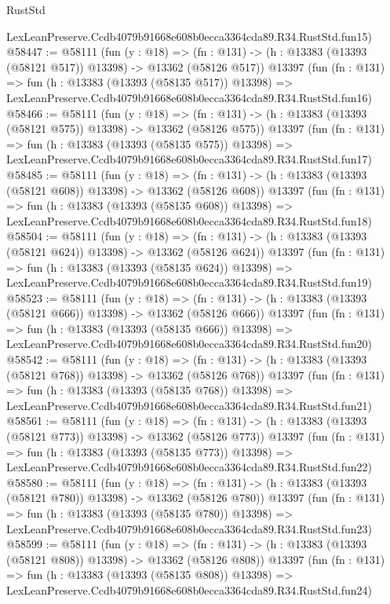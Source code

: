 \begin{lexlean}{RustStd}
\begin{coremodule}
    LexLeanPreserve.Ccdb4079b91668e608b0ecca3364cda89.R34.RustStd.fun15)
@58447 := @58111
    (fun (y : @18) =>
    (fn : @131) -> (h : @13383 (@13393 (@58121 @517)) @13398) -> @13362 (@58126 @517))
    @13397
    (fun (fn : @131) =>
    fun (h : @13383 (@13393 (@58135 @517)) @13398) =>
    LexLeanPreserve.Ccdb4079b91668e608b0ecca3364cda89.R34.RustStd.fun16)
@58466 := @58111
    (fun (y : @18) =>
    (fn : @131) -> (h : @13383 (@13393 (@58121 @575)) @13398) -> @13362 (@58126 @575))
    @13397
    (fun (fn : @131) =>
    fun (h : @13383 (@13393 (@58135 @575)) @13398) =>
    LexLeanPreserve.Ccdb4079b91668e608b0ecca3364cda89.R34.RustStd.fun17)
@58485 := @58111
    (fun (y : @18) =>
    (fn : @131) -> (h : @13383 (@13393 (@58121 @608)) @13398) -> @13362 (@58126 @608))
    @13397
    (fun (fn : @131) =>
    fun (h : @13383 (@13393 (@58135 @608)) @13398) =>
    LexLeanPreserve.Ccdb4079b91668e608b0ecca3364cda89.R34.RustStd.fun18)
@58504 := @58111
    (fun (y : @18) =>
    (fn : @131) -> (h : @13383 (@13393 (@58121 @624)) @13398) -> @13362 (@58126 @624))
    @13397
    (fun (fn : @131) =>
    fun (h : @13383 (@13393 (@58135 @624)) @13398) =>
    LexLeanPreserve.Ccdb4079b91668e608b0ecca3364cda89.R34.RustStd.fun19)
@58523 := @58111
    (fun (y : @18) =>
    (fn : @131) -> (h : @13383 (@13393 (@58121 @666)) @13398) -> @13362 (@58126 @666))
    @13397
    (fun (fn : @131) =>
    fun (h : @13383 (@13393 (@58135 @666)) @13398) =>
    LexLeanPreserve.Ccdb4079b91668e608b0ecca3364cda89.R34.RustStd.fun20)
@58542 := @58111
    (fun (y : @18) =>
    (fn : @131) -> (h : @13383 (@13393 (@58121 @768)) @13398) -> @13362 (@58126 @768))
    @13397
    (fun (fn : @131) =>
    fun (h : @13383 (@13393 (@58135 @768)) @13398) =>
    LexLeanPreserve.Ccdb4079b91668e608b0ecca3364cda89.R34.RustStd.fun21)
@58561 := @58111
    (fun (y : @18) =>
    (fn : @131) -> (h : @13383 (@13393 (@58121 @773)) @13398) -> @13362 (@58126 @773))
    @13397
    (fun (fn : @131) =>
    fun (h : @13383 (@13393 (@58135 @773)) @13398) =>
    LexLeanPreserve.Ccdb4079b91668e608b0ecca3364cda89.R34.RustStd.fun22)
@58580 := @58111
    (fun (y : @18) =>
    (fn : @131) -> (h : @13383 (@13393 (@58121 @780)) @13398) -> @13362 (@58126 @780))
    @13397
    (fun (fn : @131) =>
    fun (h : @13383 (@13393 (@58135 @780)) @13398) =>
    LexLeanPreserve.Ccdb4079b91668e608b0ecca3364cda89.R34.RustStd.fun23)
@58599 := @58111
    (fun (y : @18) =>
    (fn : @131) -> (h : @13383 (@13393 (@58121 @808)) @13398) -> @13362 (@58126 @808))
    @13397
    (fun (fn : @131) =>
    fun (h : @13383 (@13393 (@58135 @808)) @13398) =>
    LexLeanPreserve.Ccdb4079b91668e608b0ecca3364cda89.R34.RustStd.fun24)

\end{coremodule}
\end{lexlean}
